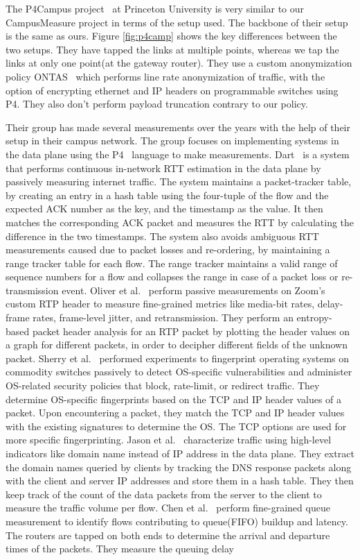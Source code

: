 The P4Campus project~\cite{p4campusprinceton} at Princeton University is very similar to our CampusMeasure project in terms of the setup used. The backbone of their setup is the same as ours. Figure \ref{fig:p4camp} shows the key differences between the two setups. They have tapped the links at multiple points, whereas we tap the links at only one point(at the gateway router). They use a custom anonymization policy ONTAS~\cite{ontas-netai19} which performs line rate anonymization of traffic, with the option of encrypting ethernet and IP headers on programmable switches using P4. They also don't perform payload truncation contrary to our policy.

Their group has made several measurements over the years with the help of their setup in their campus network. The group focuses on implementing systems in the data plane using the P4~\cite{p4lang} language to make measurements. Dart~\cite{dart-sigcomm22} is a system that performs continuous in-network RTT estimation in the data plane by passively measuring internet traffic. The system maintains a packet-tracker table, by creating an entry in a hash table using the four-tuple of the flow and the expected ACK number as the key, and the timestamp as the value. It then matches the corresponding ACK packet and measures the RTT by calculating the difference in the two timestamps. The system also avoids ambiguous RTT measurements caused due to packet losses and re-ordering, by maintaining a range tracker table for each flow. The range tracker maintains a valid range of sequence numbers for a flow and collapses the range in case of a packet loss or re-transmission event. Oliver et al.~\cite{zoom-imc22} perform passive measurements on Zoom's custom RTP header to measure fine-grained metrics like media-bit rates, delay-frame rates, frame-level jitter, and retransmission. They perform an entropy-based packet header analysis for an RTP packet by plotting the header values on a graph for different packets, in order to decipher different fields of the unknown packet. Sherry et al.~\cite{osfingerprint-netsoft22} performed experiments to fingerprint operating systems on commodity switches passively to detect OS-specific vulnerabilities and administer OS-related security policies that block, rate-limit, or redirect traffic. They determine OS-specific fingerprints based on the TCP and IP header values of a packet. Upon encountering a packet, they match the TCP and IP header values with the existing signatures to determine the OS. The TCP options are used for more specific fingerprinting. Jason et al.~\cite{domainnameanalysis-sosr21} characterize traffic using high-level indicators like domain name instead of IP address in the data plane. They extract the domain names queried by clients by tracking the DNS response packets along with the client and server IP addresses and store them in a hash table. They then keep track of the count of the data packets from the server to the client to measure the traffic volume per flow. Chen et al.~\cite{conquest-conext19} perform fine-grained queue measurement to identify flows contributing to queue(FIFO) buildup and latency. The routers are tapped on both ends to determine the arrival and departure times of the packets. They measure the queuing delay 